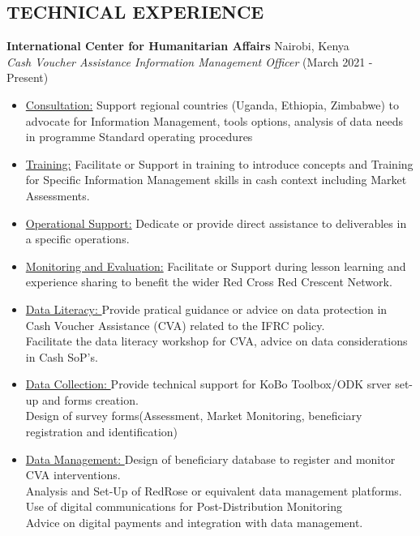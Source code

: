 \documentclass[line,margin,10pt]{res}
\begin{document}
\begin{resume}
\section{TECHNICAL EXPERIENCE}
\textbf{International Center for Humanitarian Affairs} \hfill Nairobi, Kenya\\
{\sl Cash Voucher Assistance Information Management Officer} \hfill (March 2021 - Present)
\begin{itemize} \itemsep -2pt
	\item \underline{Consultation:}
    Support regional countries (Uganda, Ethiopia, Zimbabwe) to advocate for Information Management, tools options, analysis of data needs in programme Standard operating procedures
    \item \underline{Training:}
    Facilitate or Support in training to introduce concepts and Training for Specific Information Management skills in cash context including Market Assessments.
    \item \underline{Operational Support:}
    Dedicate or provide direct assistance to deliverables in a specific operations.
    \item \underline{Monitoring and Evaluation:}
    Facilitate or Support during lesson learning and experience sharing to benefit the wider Red Cross Red Crescent Network.
    \item \underline{Data Literacy: }
    Provide pratical guidance or advice on data protection in Cash Voucher Assistance (CVA) related to the IFRC policy.\\
    Facilitate the data literacy workshop for CVA, advice on data considerations in Cash SoP's.\\
    \item \underline{Data Collection: }
    Provide technical support for KoBo Toolbox/ODK srver set-up and forms creation.\\
    Design of survey forms(Assessment, Market Monitoring, beneficiary registration and identification)\\
    \item \underline{Data Management: }
    Design of beneficiary database to register and monitor CVA interventions.\\
    Analysis and Set-Up of RedRose or equivalent data management platforms.\\
    Use of digital communications for Post-Distribution Monitoring\\
    Advice on digital payments and integration with data management.\\

\end{itemize}
\end{resume}
\end{document}
